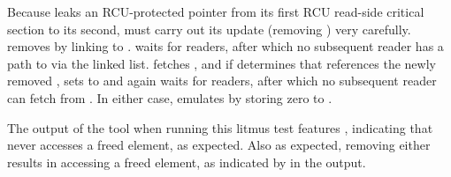\begin{fcvref}
Because  leaks an RCU-protected pointer from its first
RCU read-side critical section to its second,  must carry
out its update (removing ) very carefully.
 removes  by linking  to .
 waits for readers, after which no subsequent reader
has a path to  via the linked list.
 fetches , and if 
determines that  references the newly removed ,
 sets  to 
and  again waits for readers, after which no
subsequent reader can fetch  from .
In either case,  emulates  by storing
zero to .

\QuickQuizEnd

The output of the  tool when running this litmus test features
, indicating that  never accesses a freed element,
as expected.
Also as expected, removing either  results
in  accessing a freed element, as indicated by 
in the  output.
\end{fcvref}

